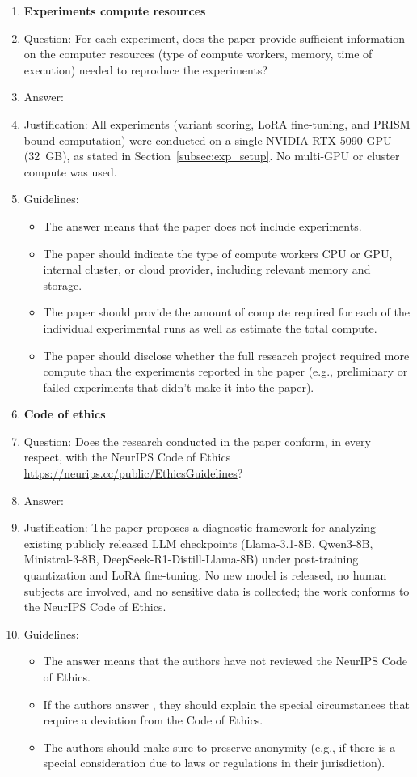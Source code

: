 \begin{enumerate}
\item {\bf Experiments compute resources}
    \item[] Question: For each experiment, does the paper provide sufficient information on the computer resources (type of compute workers, memory, time of execution) needed to reproduce the experiments?
    \item[] Answer: \answerYes{}
    \item[] Justification: All experiments (variant scoring, LoRA fine-tuning, and PRISM bound computation) were conducted on a single NVIDIA RTX 5090 GPU (32~GB), as stated in Section~\ref{subsec:exp_setup}. No multi-GPU or cluster compute was used.
    \item[] Guidelines:
    \begin{itemize}
        \item The answer \answerNA{} means that the paper does not include experiments.
        \item The paper should indicate the type of compute workers CPU or GPU, internal cluster, or cloud provider, including relevant memory and storage.
        \item The paper should provide the amount of compute required for each of the individual experimental runs as well as estimate the total compute.
        \item The paper should disclose whether the full research project required more compute than the experiments reported in the paper (e.g., preliminary or failed experiments that didn't make it into the paper).
    \end{itemize}

\item {\bf Code of ethics}
    \item[] Question: Does the research conducted in the paper conform, in every respect, with the NeurIPS Code of Ethics \url{https://neurips.cc/public/EthicsGuidelines}?
    \item[] Answer: \answerYes{}
    \item[] Justification: The paper proposes a diagnostic framework for analyzing existing publicly released LLM checkpoints (Llama-3.1-8B, Qwen3-8B, Ministral-3-8B, DeepSeek-R1-Distill-Llama-8B) under post-training quantization and LoRA fine-tuning. No new model is released, no human subjects are involved, and no sensitive data is collected; the work conforms to the NeurIPS Code of Ethics.
    \item[] Guidelines:
    \begin{itemize}
        \item The answer \answerNA{} means that the authors have not reviewed the NeurIPS Code of Ethics.
        \item If the authors answer \answerNo, they should explain the special circumstances that require a deviation from the Code of Ethics.
        \item The authors should make sure to preserve anonymity (e.g., if there is a special consideration due to laws or regulations in their jurisdiction).
    \end{itemize}



\end{enumerate}
